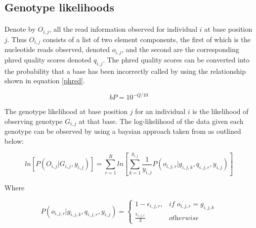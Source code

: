 \documentclass[11pt]{article}
\begin{document}
\subsection{Genotype likelihoods}
\paragraph{}Denote by $O_{i,j}$, all the read information observed for individual $i$ at base position $j$. Thus $O_{i,j}$ consists of a list of two element components, the first of which is the nucleotide reads observed, denoted $o_{i,j}$, and the second are the corresponding phred quality scores denoted $q_{i,j}$. The phred quality scores can be converted into the probability that a base has been incorrectly called by using the relationship shown in equation \ref{phred}.

\begin{equation}\label{phred}
bP=10^{-Q/10}
\end{equation} 

The genotype likelihood at base position $j$ for an individual $i$ is the likelihood of observing genotype $G_{i,j}$ at that base. The log-likelihood of the data given each genotype can be observed by using a baysian approach taken from \autocite{Nielsen2011} as outlined below: 

\begin{equation}\label{geno_likes}
ln[P(O_{i,j}|G_{i,j},y_{i,j})]=\sum_{r=1}^{R}ln[\sum_{k=1}^{y_{i,j}}\frac{1}{y_{i,j} }P(o_{i,j,r}|g_{i,j,k},q_{i,j,r},y_{i,j})]
\end{equation} 

Where

\begin{equation}
P(o_{i,j,r}|g_{i,j,k},q_{i,j,r},y_{i,j})=
	\begin{cases} 
		1 - \epsilon_{i,j,r}, & \textit{if } o_{i,j,r} = g_{i,j,k} \\
    	\frac{\epsilon_{i,j,r}}{3} & \textit{otherwise}
	\end{cases}
\end{equation}
\end{document}
